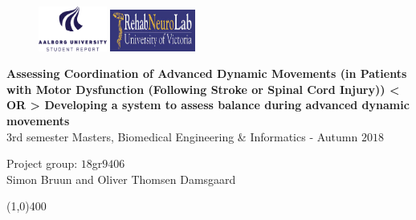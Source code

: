 \clearpage
\thispagestyle{empty}

\begin{figure}[H]
	\raggedleft
	\includegraphics[width=0.2\textwidth]{setup/aaulogo-en.png}
	\hspace{8.5cm}
	\includegraphics[width=0.25\textwidth]{setup/RNL.png}
\end{figure} 

\vspace{3 cm}

\begin{center}
	\begin{Huge}
		\textbf{Assessing Coordination of Advanced Dynamic Movements (in Patients with Motor Dysfunction (Following Stroke or Spinal Cord Injury)) < OR > Developing a system to assess balance during advanced dynamic movements}\\ 
		\vspace{20 mm}
		3rd semester Masters, Biomedical Engineering \& Informatics - Autumn $2018$\\
		\vspace{3 mm}
	\end{Huge}
	{\Large Project group: $18$gr$9406$} \\
	\vspace{1cm}
	\large{Simon Bruun and Oliver Thomsen Damsgaard}
\end{center}
\vspace*{\fill}

\begin{center}
	\line(1,0){400}
\end{center}

